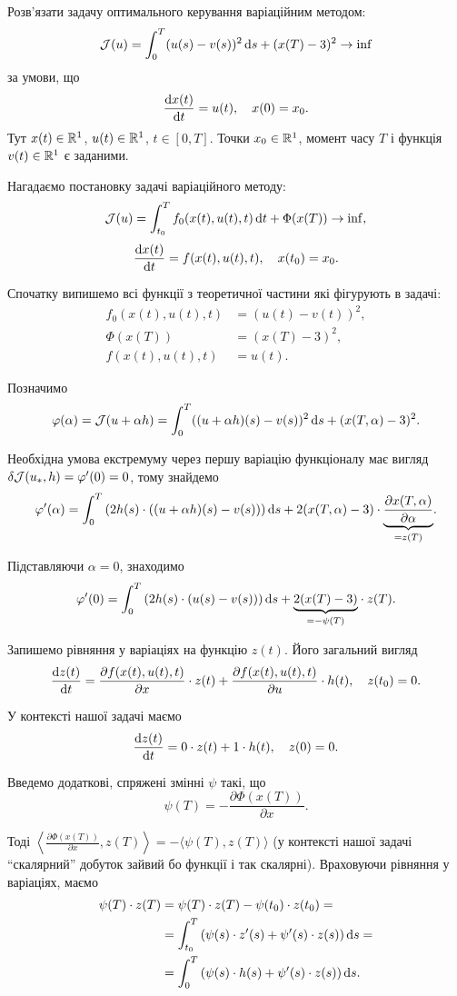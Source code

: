 \begin{problem}
	Розв'язати задачу оптимального керування варіаційним методом: \[ \mathcal{J} (u) = \int_0^T (u (s) - v (s))^2 \mathop{}\!\mathrm{d} s + (x (T) - 3)^2 \to \inf \] за умови, що \[ \frac{\mathop{}\!\mathrm{d} x (t)}{\mathop{}\!\mathrm{d} t} = u(t), \quad x(0) = x_0. \] Тут $x (t) \in \mathbb{R}^1$, $u (t) \in \mathbb{R}^1$, $t \in [0, T]$. Точки $x_0 \in \mathbb{R}^1$, момент часу $T$ і функція $v (t) \in \mathbb{R}^1$ є заданими.
\end{problem}

\begin{solution}
	Нагадаємо постановку задачі варіаційного методу: \[ \mathcal{J} (u) = \int_{t_0}^T f_0 (x(t), u(t), t) \mathop{}\!\mathrm{d} t + \Phi(x(T)) \to \inf, \] \[ \frac{\mathop{}\!\mathrm{d} x (t)}{\mathop{}\!\mathrm{d} t} = f(x(t), u(t), t), \quad x(t_0) = x_0. \]

	Спочатку випишемо всі функції з теоретичної частини які фігурують в задачі: 
	\begin{align*}
		f_0(x(t), u(t), t) &= (u (t) - v (t))^2, \\
		\Phi(x(T)) &= (x (T) - 3)^2, \\
		f(x(t), u(t), t) &= u(t).
	\end{align*}

	Позначимо \[ \varphi (\alpha) = \mathcal{J} (u + \alpha h) = \int_0^T ((u + \alpha h) (s) - v (s))^2 \mathop{}\!\mathrm{d} s + (x (T, \alpha) - 3)^2. \]

	Необхідна умова екстремуму через першу варіацію функціоналу має вигляд $\delta \mathcal{J} (u_*, h) = \varphi' (0) = 0$, тому знайдемо \[ \varphi' (\alpha) = \int_0^T \left( 2 h (s) \cdot ((u + \alpha h) (s) - v (s)) \right) \mathop{}\!\mathrm{d} s + 2 (x (T, \alpha) - 3) \cdot \underset{=z(T)}{\underbrace{\frac{\partial x (T, \alpha)}{\partial \alpha}}}. \]

	Підставляючи $\alpha = 0$, знаходимо \[ \varphi' (0) = \int_0^T \left( 2 h (s) \cdot (u(s) - v (s)) \right) \mathop{}\!\mathrm{d} s + \underset{=-\psi(T)}{\underbrace{2 (x (T) - 3)}} \cdot z (T). \]

	Запишемо рівняння у варіаціях на функцію $z(t)$. Його загальний вигляд \[ \frac{\mathop{}\!\mathrm{d} z(t)}{\mathop{}\!\mathrm{d} t} = \frac{\partial f(x(t), u(t), t)}{\partial x} \cdot z(t) + \frac{\partial f(x(t), u(t), t)}{\partial u} \cdot h(t), \quad z(t_0) = 0. \]

	У контексті нашої задачі маємо \[ \frac{\mathop{}\!\mathrm{d} z(t)}{\mathop{}\!\mathrm{d} t} = 0 \cdot z(t) + 1 \cdot h(t), \quad z(0) = 0. \]

	Введемо додаткові, спряжені змінні $\psi$ такі, що \[ \psi (T) = - \frac{\partial \Phi (x (T))}{\partial x}. \] 

	Тоді $\left\langle \frac{\partial \Phi (x (T))}{\partial x}, z (T) \right\rangle = - \langle \psi (T), z (T) \rangle$ (у контексті нашої задачі ``скалярний'' добуток зайвий бо функції і так скалярні). Враховуючи рівняння у варіаціях, маємо
	\begin{align*}
		\psi (T) \cdot z (T) &= \psi (T) \cdot z (T) - \psi (t_0) \cdot z (t_0) = \\
		&= \int_{t_0}^T \left( \psi (s) \cdot z' (s) + \psi' (s) \cdot z (s) \right) \mathop{}\!\mathrm{d} s = \\
		&= \int_0^T \left( \psi (s) \cdot h (s) + \psi' (s) \cdot z (s) \right) \mathop{}\!\mathrm{d} s.
	\end{align*}


\end{solution}
